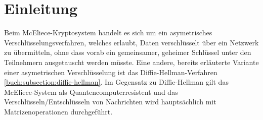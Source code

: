 %
%
%
\section{Einleitung
\label{mceliece:section:einleitung}}
Beim McEliece-Kryptosystem handelt es sich um ein asymetrisches Verschlüsselungsverfahren, welches erlaubt,
Daten verschlüsselt über ein Netzwerk zu übermitteln, ohne dass vorab ein gemeinsamer,
geheimer Schlüssel unter den Teilnehmern ausgetauscht werden müsste.
Eine andere, bereits erläuterte Variante einer asymetrischen Verschlüsselung ist das Diffie-Hellman-Verfahren \ref{buch:subsection:diffie-hellman}.
Im Gegensatz zu Diffie-Hellman gilt das McEliece-System als Quantencomputerresistent
und das Verschlüsseln/Entschlüsseln von Nachrichten wird hauptsächlich mit Matrizenoperationen durchgeführt.


